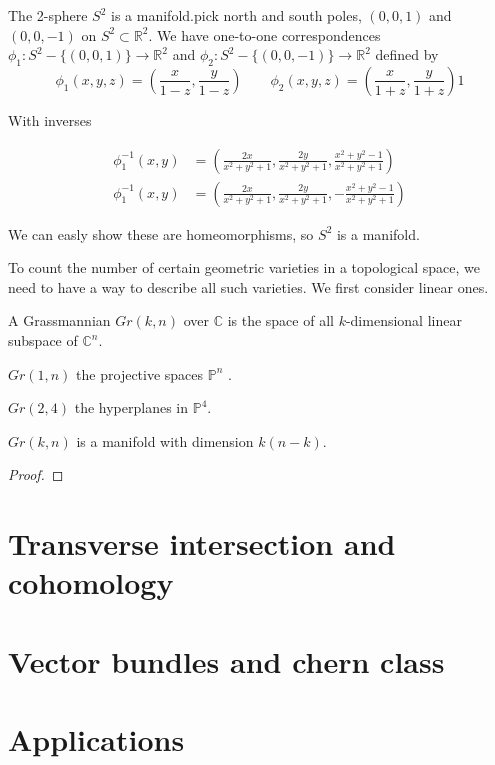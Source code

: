 \documentclass{article}
\begin{document}
\begin{eg}
    The 2-sphere $S^{2}$ is a manifold.pick north and south poles, $(0,0,1)$ 
    and $(0,0,-1)$ on $S^{2} \subset \mathbb{R}^{2}$. We have one-to-one correspondences
    $\phi_{1} : S^{2}- \{(0,0,1)\} \longrightarrow \mathbb{R}^{2} $ and 
    $\phi_{2} : S^{2}- \{(0,0,-1)\} \longrightarrow \mathbb{R}^{2}$ defined by\\
    
    \[
    \phi_{1}(x,y,z) = (\frac{x}{1-z},\frac{y}{1-z}) \qquad 
    \phi_{2}(x,y,z) = (\frac{x}{1+z},\frac{y}{1+z})1
    \]

    With inverses
    
    \begin{align*}
    \phi_{1}^{-1}(x,y) & = {}(\frac{2x}{x^{2}+y^{2}+1},\frac{2y}{x^{2}+y^{2}+1},\frac{x^{2}+y^{2}-1}{x^{2}+y^{2}+1}) \\
    \phi_{1}^{-1}(x,y) & = {}(\frac{2x}{x^{2}+y^{2}+1},\frac{2y}{x^{2}+y^{2}+1},-\frac{x^{2}+y^{2}-1}{x^{2}+y^{2}+1})
    \end{align*}
 
    We can easly show these are homeomorphisms, so $S^{2}$ is a manifold.
\end{eg}

To count the number of certain geometric varieties in a topological space, we need to have a way to describe 
all such varieties. We first consider linear ones.
\begin{df}
A Grassmannian $Gr(k,n)$ over $\mathbb{C}$ is the space of all $k$-dimensional 
linear subspace of $\mathbb{C}^{n}$. 
\end{df}

\begin{eg}
$Gr(1,n)$ the projective spaces $\mathbb{P}^{n}$ .
\end{eg}

\begin{eg}
$Gr(2,4)$ the hyperplanes in $\mathbb{P}^{4}$.
\end{eg}

\begin{thm}
$Gr(k,n)$ is a manifold with dimension $k(n-k) $. 
\end{thm}
\begin{proof}

\end{proof}

\newpage
\section{Transverse intersection and cohomology}

\newpage
\section{Vector bundles and chern class}

\newpage
\section{Applications}
\end{document}
